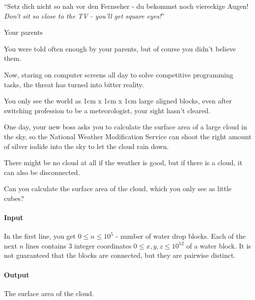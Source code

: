 

\usepackage{epigraph}



\makeheader

\epigraph{``Setz dich nicht so nah vor den Fernseher - du bekommst noch
  viereckige Augen!\\ \textit{Don't sit so close to the TV - you'll get square
    eyes!}''}{Your parents}

You were told often enough by your parents, but of course you didn't believe them.

Now, staring on computer screens all day to solve competitive programming tasks, the threat has turned into bitter reality.

You only see the world as 1cm x 1cm x 1cm large aligned blocks, even after switching profession to be a meteorologist, your sight hasn't cleared.

One day, your new boss asks you to calculate the surface area of a large cloud in the sky, so the National Weather Modification Service can shoot the right amount of silver iodide into the sky to let the cloud rain down.

There might be no cloud at all if the weather is good, but if there is a cloud, it can also be disconnected.

Can you calculate the surface area of the cloud, which you only see as little cubes?

\paragraph*{Input}

In the first line, you get $0 \leq n \leq 10^5$ - number of water drop blocks.
Each of the next $n$ lines contains 3 integer coordinates $0 \leq x, y, z \leq 10^{12}$ of a water block. It is not guaranteed that the blocks are connected, but they are pairwise distinct.

\paragraph*{Output}

The surface area of the cloud.

\begin{samples}
\end{samples}

